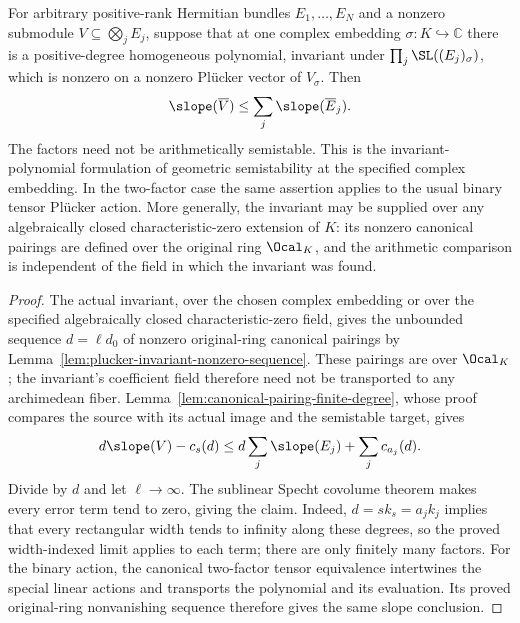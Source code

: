 \begin{theorem}
\label{thm:geometric-slope}
\leanok
{}
For arbitrary positive-rank Hermitian bundles $E_1,\ldots,E_N$ and
a nonzero submodule $V\subseteq\bigotimes_j E_j$, suppose that at
one complex embedding $\sigma:K\hookrightarrow\mathbb C$ there is a
positive-degree homogeneous polynomial, invariant under
$\prod_j\SL((E_j)_\sigma)$, which is nonzero on a nonzero Pl\"ucker
vector of $V_\sigma$. Then
\[
 \slope(\overline V)\leq\sum_j\slope(\overline E_j).
\]
The factors need not be arithmetically semistable.
This is the invariant-polynomial formulation of geometric semistability
at the specified complex embedding. In the two-factor case
the same assertion applies to the usual binary tensor Pl\"ucker action.
More generally, the invariant may be supplied over any algebraically
closed characteristic-zero extension of $K$: its nonzero canonical
pairings are defined over the original ring $\Ocal_K$, and the
arithmetic comparison is independent of the field in which the
invariant was found.
\end{theorem}
\begin{proof}
The actual invariant, over the chosen complex embedding or over the
specified algebraically closed characteristic-zero field, gives the unbounded
sequence $d=\ell d_0$ of nonzero original-ring canonical pairings
by Lemma~\ref{lem:plucker-invariant-nonzero-sequence}.
These pairings are over $\Ocal_K$; the invariant's coefficient field
therefore need not be transported to any archimedean fiber.
Lemma~\ref{lem:canonical-pairing-finite-degree}, whose proof compares
the source with its actual image and the semistable target, gives
\[
 d\slope(V)-c_s(d)\leq d\sum_j\slope(E_j)+\sum_jc_{a_j}(d).
\]
Divide by $d$ and let $\ell\to\infty$. The sublinear Specht covolume
theorem makes every error term tend to zero, giving the claim.
Indeed, $d=s k_s=a_jk_j$ implies that every rectangular width tends
to infinity along these degrees, so the proved width-indexed limit
applies to each term; there are only finitely many factors.
For the binary action, the canonical two-factor tensor equivalence
intertwines the special linear actions and transports the polynomial
and its evaluation. Its proved original-ring nonvanishing sequence
therefore gives the same slope conclusion.
\end{proof}
